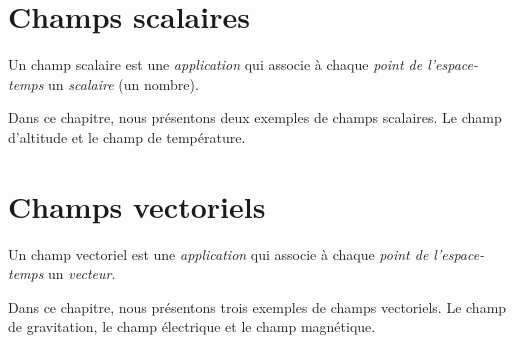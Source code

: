 \chapter{Champs scalaires}
%
Un champ scalaire est une {\it application} qui associe à chaque {\it point de l'espace-temps} un {\it scalaire} (un nombre).

Dans ce chapitre, nous présentons deux exemples de champs scalaires. Le champ d'altitude et le champ de température.


%

%
\chapter{Champs vectoriels}
%
Un champ vectoriel est une {\it application} qui associe à chaque {\it point de l'espace-temps} un {\it vecteur}.


Dans ce chapitre, nous présentons trois exemples de champs vectoriels. Le champ de gravitation, le champ électrique et le champ magnétique.


%

%

%


